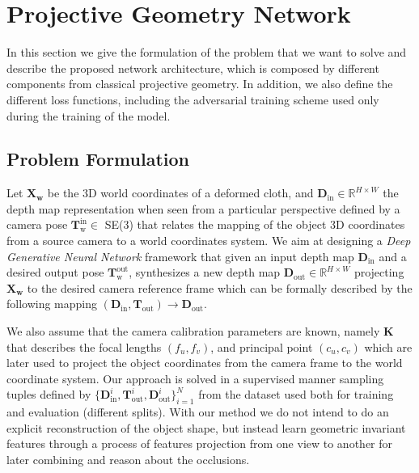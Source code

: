 \section{Projective Geometry Network}
In this section we give the formulation of the problem that we want to solve and describe the proposed network architecture, which is composed by different components from classical projective geometry. In addition, we also define the different loss functions, including the adversarial training scheme used only during the training of the model.


\subsection{Problem Formulation}
Let $\mathbf{X_w}$ be the 3D world coordinates of a deformed cloth, and $\mathbf{D}_{\textrm{in}} \in \mathbb{R}^{H \times W}$ the depth map representation when seen from a particular perspective defined by a camera pose $\mathbf{T}_{\textrm{w}}^{\textrm{in}}\in$ SE(3) that relates the mapping of the object 3D coordinates from a source camera to a world coordinates system. We aim at designing a \textit{Deep Generative Neural Network} framework that given an input depth map $\mathbf{D}_{\textrm{in}}$ and a desired output pose $\mathbf{T}_{\textrm{w}}^{\textrm{out}}$, synthesizes a new depth map $\mathbf{D}_{\textrm{out}}\in \mathbb{R}^{H \times W}$ projecting $\mathbf{X_w}$ to the desired camera reference frame which can be formally described by the following mapping $(\mathbf{D}_{\textrm{in}}, \mathbf{T}_{\textrm{out}})\rightarrow \mathbf{D}_{\textrm{out}}$.

We also assume that the camera calibration parameters are known, namely $\mathbf{K}$ that describes the focal lengths $(f_u, f_v)$, and principal point $(c_u, c_v)$ which are later  used to project the object coordinates from the camera frame to the world coordinate system. Our approach is solved in a supervised manner sampling tuples defined by $\{\mathbf{D}_{\textrm{in}}^i, \mathbf{T}_{\textrm{out}}^i, \mathbf{D}_{\textrm{out}}^i\}_{i=1}^N$ from the dataset used both for training and evaluation (different splits). With our method we do not intend to do an explicit reconstruction of the object shape, but instead learn geometric invariant features through a process of features projection from one view to another for later combining and reason about the occlusions.


